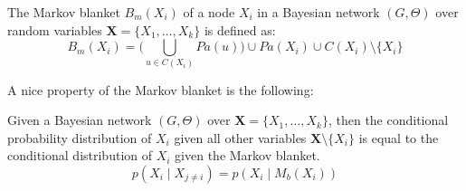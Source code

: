 \noindent
\begin{defn}
The Markov blanket $B_m(X_i)$ of a node $X_i$ in a Bayesian network
$(G, \Theta)$ over random variables $\textbf{X}=\{X_1, \dots, X_k\}$ 
is defined as:
\begin{equation}
B_m(X_i) = \Bigg(\bigcup_{u \in C(X_i)} Pa(u) \Bigg) \cup Pa(X_i) \cup C(X_i)
	\setminus \{X_i\}
\end{equation}
\end{defn}

\noindent
A nice property of the Markov blanket is the following:
\begin{prop}
Given a Bayesian network $(G, \Theta)$ over $\textbf{X}=\{X_1, 
\dots, X_k\}$, then the conditional probability distribution
of $X_i$ given all other variables $\textbf{X}\setminus \{X_i\}$
is equal to the conditional distribution of $X_i$ given the 
Markov blanket.
\begin{equation}
p( X_i \mid X_{j \neq i}) = p(X_i \mid M_b(X_i))
\end{equation}
\end{prop}

